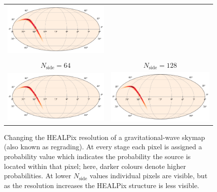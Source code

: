 \begin{colsection}
\begin{figure}[p]
\begin{center}
\begin{tabular}{cc}
            \includegraphics[width=0.45\linewidth]{images/regrade/32.png} \\
            \\
            $N_\text{side} = 64$ &
            $N_\text{side} = 128$ \\
            \includegraphics[width=0.45\linewidth]{images/regrade/64.png} &
            \includegraphics[width=0.45\linewidth]{images/regrade/128.png} \\
        \end{tabular}
    \end{center}
    \caption[Regrading a gravitational-wave skymap]{
        Changing the HEALPix resolution of a gravitational-wave skymap (also known as regrading). At every stage each pixel is assigned a probability value which indicates the probability the source is located within that pixel; here, darker colours denote higher probabilities. At lower $N_\text{side}$ values individual pixels are visible, but as the resolution increases the HEALPix structure is less visible.
    }\label{fig:skymap_regrade}
\end{figure}


\end{colsection}
